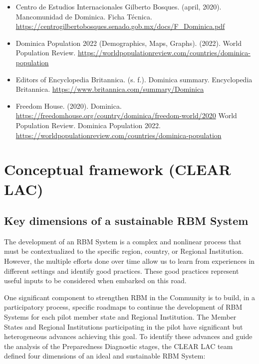 \documentclass[
]{book}
\begin{document}
\begin{itemize}
\item
  Centro de Estudios Internacionales Gilberto Bosques. (april, 2020). Mancomunidad de Dominica. Ficha Técnica. \url{https://centrogilbertobosques.senado.gob.mx/docs/F_Dominica.pdf}
\item
  Dominica Population 2022 (Demographics, Maps, Graphs). (2022). World Population Review. \url{https://worldpopulationreview.com/countries/dominica-population}
\item
  Editors of Encyclopedia Britannica. (s. f.). Dominica summary. Encyclopedia Britannica. \url{https://www.britannica.com/summary/Dominica}
\item
  Freedom House. (2020). Dominica. \url{https://freedomhouse.org/country/dominica/freedom-world/2020}
  World Population Review. Dominica Population 2022. \url{https://worldpopulationreview.com/countries/dominica-population}
\end{itemize}

\hypertarget{appendix-appendix}{%
\appendix}


\hypertarget{appendixA}{%
\chapter{Conceptual framework (CLEAR LAC)}\label{appendixA}}

\hypertarget{key-dimensions-of-a-sustainable-rbm-system}{%
\section{Key dimensions of a sustainable RBM System}\label{key-dimensions-of-a-sustainable-rbm-system}}

The development of an RBM System is a complex and nonlinear process that must be contextualized to the specific region, country, or Regional Institution. However, the multiple efforts done over time allow us to learn from experiences in different settings and identify good practices. These good practices represent useful inputs to be considered when embarked on this road.

One significant component to strengthen RBM in the Community is to build, in a participatory process, specific roadmaps to continue the development of RBM Systems for each pilot member state and Regional Institution. The Member States and Regional Institutions participating in the pilot have significant but heterogeneous advances achieving this goal. To identify these advances and guide the analysis of the Preparedness Diagnostic stages, the CLEAR LAC team defined four dimensions of an ideal and sustainable RBM System:
\end{document}
